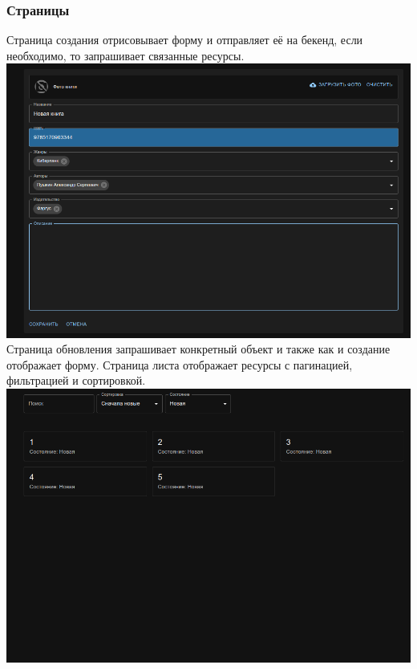 \documentclass[a4paper,14pt]{extarticle}
\begin{document}
\subsubsection{Страницы}
Страница создания отрисовывает форму и отправляет её на бекенд, если необходимо, то запрашивает связанные
ресурсы.\\
\includegraphics[width=140mm]{create.png}\\

Страница обновления запрашивает конкретный объект и также как и создание отображает форму.
Страница листа отображает ресурсы с пагинацией, фильтрацией и сортировкой.\\
\includegraphics[width=140mm]{list.png}\\
\end{document}
